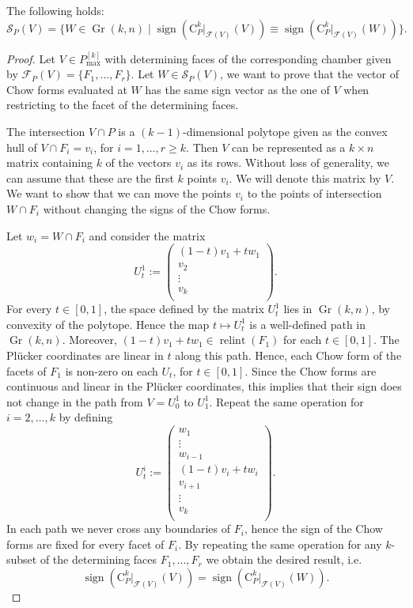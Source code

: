 \documentclass[english]{ourlematema}
\DeclareMathOperator{\Gr}{Gr}
\DeclareMathOperator{\sign}{sign}
\DeclareMathOperator{\relint}{relint}
\newcommand{\mF}{\mathcal{F}}
\newcommand{\mS}{\mathcal{S}}
\newcommand{\Pkmax}{P^{[k]}_{\max}}
\newcommand{\CPk}{\mathrm{C}_P^k}
\begin{document}
\begin{thm}\label{thm : sign var}
    The following holds:
    \[ \mS_P(V) = \{ W\in \Gr(k,n) \mid \sign(\CPk|_{\mF(V)}(V)) \equiv \sign(\CPk|_{\mF(V)}(W)) \}. \]
\end{thm}
\begin{proof}
    Let $V\in \Pkmax$ with determining faces of the corresponding chamber given by $\mF_P(V) = \{F_1,\ldots,F_r\}$. 
    Let $W\in \mS_P(V)$, we want to prove that the vector of Chow forms evaluated at $W$ has the same sign vector as the one of $V$ when restricting to the facet of the determining faces.

    The intersection $V\cap P$ is a $(k-1)$-dimensional polytope given as the convex hull of $V\cap F_i = v_i$, for $i=1,\ldots,r\geq k$. Then $V$ can be represented as a $k\times n$ matrix containing $k$ of the vectors $v_i$ as its rows. Without loss of generality, we can assume that these are the first $k$ points $v_i$. We will denote this matrix by $V$. We want to show that we can move the points $v_i$ to the points of intersection $W\cap F_i$ without changing the signs of the Chow forms.

    Let $w_i=W\cap F_i$ and consider the matrix
    \[ U^1_t:=\begin{pmatrix}
    (1-t)v_1 + tw_1 \\
    v_2\\
    \vdots   \\
    v_{k} \\
    \end{pmatrix}. \]
    For every $t\in [0,1]$, the space defined by the matrix $U^1_t$ lies in $\Gr(k,n)$, by convexity of the polytope.
    Hence the map $t \mapsto U^1_t$ is a well-defined path in $\Gr(k,n)$. Moreover, $(1-t)v_1 + tw_1 \in \relint(F_1)$ for each $t\in [0,1]$. The Pl\"ucker coordinates are linear in $t$ along this path. Hence, each Chow form of the facets of $F_1$ is non-zero on each $U_t$, for $t\in[0,1]$. Since the Chow forms are continuous and linear in the Pl\"ucker coordinates, this implies that their sign does not change in the path from $V=U^1_0$ to $U^1_1$. Repeat the same operation for $i=2,\ldots,k$ by defining 
    \[ U^i_t:=\begin{pmatrix}
    w_1 \\
    \vdots\\
    w_{i-1}\\
    (1-t)v_i + tw_i\\
    v_{i+1}\\
    \vdots   \\
    v_{k} \\
    \end{pmatrix}. \]
    In each path we never cross any boundaries of $F_i$, hence the sign of the Chow forms are fixed for every facet of $F_i$. By repeating the same operation for any $k$-subset of the determining faces $F_1,\ldots, F_r$ we obtain the desired result, i.e.
    \[ \sign(\CPk|_{\mF(V)}(V)) = \sign(\CPk|_{\mF(V)}(W)). \]


\end{proof}
\end{document}
